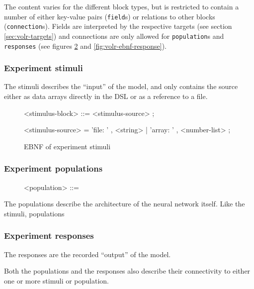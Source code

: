 The content varies for the different block types, but is restricted to contain
a number of either key-value pairs (\texttt{field}s) or relations to other
blocks (\texttt{connection}s).
Fields are interpreted by the respective targets (see section
\ref{sec:volr-targets}) and connections are only allowed for
\texttt{population}s and \texttt{responses} (see figures
\ref{fig:volr-ebnf-population} and \ref{fig:volr-ebnf-response}).

\subsubsection{Experiment stimuli}
The stimuli describes the ``input'' of the model, and only contains the source
either as data arrays directly in the DSL or as a reference to a file.

\begin{figure}
  \label{fig:volr-ebnf-stimuli}
  \begin{minipage}{0.9\linewidth}
    \begin{grammar}
      <stimulus-block> ::= <stimulus-source> ;

      <stimulus-source> = 'file: ' , <string> | 'array: ' , <number-list> ;
    \end{grammar}
  \end{minipage}
  \caption{EBNF of experiment stimuli}
\end{figure}

\subsubsection{Experiment populations}

\begin{figure}
  \label{fig:volr-ebnf-population}
  \begin{minipage}{0.9\linewidth}
    \begin{grammar}
      <population> ::=
    \end{grammar}
  \end{minipage}
\end{figure}
The populations describe the architecture of the neural network itself.
Like the stimuli, populations

\subsubsection{Experiment responses}
The responses are the recorded ``output'' of the model.

Both the populations
and the responses also describe their connectivity to either one or more
stimuli or population.

